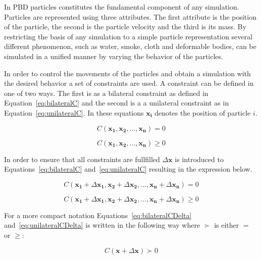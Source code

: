 In PBD particles constitutes the fundamental component of
any simulation.  Particles are represented using three attributes. The first
attribute is the position of the particle, the second is the particle velocity
and the third is its mass. By restricting the basis of any simulation to a
simple particle representation several different phenomenon, such as water,
smoke, cloth and deformable bodies, can be simulated in a unified manner by
varying the behavior of the particles.

In order to control the movements of the particles and obtain a simulation with
the desired behavior a set of constraints are used. A constraint can be defined
in one of two ways. The first is as a bilateral constraint as defined in
Equation~\ref{eq:bilateralC} and the second is a a unilateral constraint as in
Equation~\ref{eq:unilateralC}. In these equations $ \mathbf{x_{i}} $ denotes
the position of particle $ i $.

\begin{equation}
\label{eq:bilateralC}
C(\mathbf{x_{1}}, \mathbf{x_{2}}, ..., \mathbf{x_{n}}) = 0
\end{equation}

\begin{equation}
\label{eq:unilateralC}
C(\mathbf{x_{1}}, \mathbf{x_{2}}, ..., \mathbf{x_{n}}) \geq 0
\end{equation}

In order to ensure that all constraints are fullfilled $ \Delta \mathbf{x} $ is
introduced to Equations~\ref{eq:bilateralC} and~\ref{eq:unilateralC} resulting
in the expression below.

\begin{equation}
\label{eq:bilateralCDelta}
C(\mathbf{x_{1}} + \Delta \mathbf{x_{1}}, \mathbf{x_{2}} + \Delta \mathbf{x_{2}}, ..., \mathbf{x_{n}} + \Delta \mathbf{x_{n}}) = 0
\end{equation}

\begin{equation}
\label{eq:unilateralCDelta}
C(\mathbf{x_{1}} + \Delta \mathbf{x_{1}}, \mathbf{x_{2}} + \Delta \mathbf{x_{2}}, ..., \mathbf{x_{n}} + \Delta \mathbf{x_{n}}) \geq 0
\end{equation}

For a more compact notation Equations~\ref{eq:bilateralCDelta}
and~\ref{eq:unilateralCDelta} is written in the following way
where $ \succ $ is either $ = $ or $ \geq $:

\begin{equation}
\label{eq:cCombined}
C(\mathbf{x} + \Delta \mathbf{x}) \succ 0
\end{equation}

